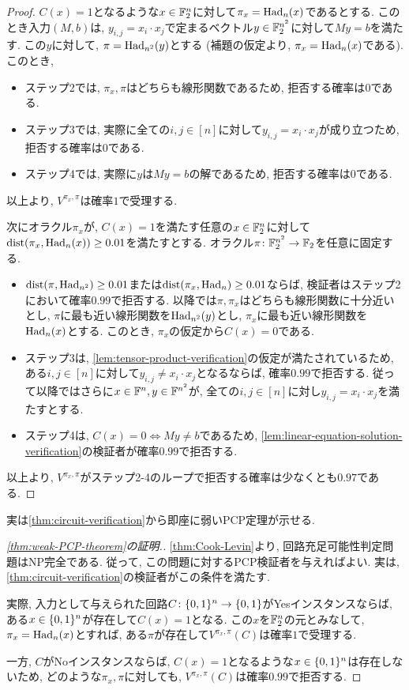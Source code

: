 \begin{proof}
    $C(x)=1$となるような$x\in\mathbb{F}_2^n$に対して$\pi_x=\mathrm{Had}_n(x)$であるとする.
    このとき入力$(M,b)$は, $y_{i,j}=x_i\cdot x_j$で定まるベクトル$y\in\mathbb{F}_2^{n^2}$に対して$My=b$を満たす.
    この$y$に対して, $\pi=\mathrm{Had}_{n^2}(y)$とする (補題の仮定より, $\pi_x=\mathrm{Had}_n(x)$である).
    このとき, 
    \begin{itemize}
      \item ステップ2では, $\pi_x,\pi$はどちらも線形関数であるため, 拒否する確率は$0$である.
      \item ステップ3では, 実際に全ての$i,j\in [n]$に対して$y_{i,j}=x_i\cdot x_j$が成り立つため, 拒否する確率は$0$である.
      \item ステップ4では, 実際に$y$は$My=b$の解であるため, 拒否する確率は$0$である.
    \end{itemize}
    以上より, $V^{\pi_x,\pi}$は確率$1$で受理する.

    次にオラクル$\pi_x$が, $C(x)=1$を満たす任意の$x\in\mathbb{F}_2^n$に対して$\mathrm{dist}(\pi_x,\mathrm{Had}_n(x))\ge 0.01$を満たすとする. オラクル$\pi\colon\mathbb{F}_2^{n^2}\to\mathbb{F}_2$を任意に固定する.

    \begin{itemize}
      \item $\mathrm{dist}(\pi,\mathrm{Had}_{n^2})\ge 0.01$または$\mathrm{dist}(\pi_x,\mathrm{Had}_n)\ge 0.01$ならば, 検証者はステップ2において確率$0.99$で拒否する. 以降では$\pi,\pi_x$はどちらも線形関数に十分近いとし, $\pi$に最も近い線形関数を$\mathrm{Had}_{n^2}(y)$とし, $\pi_x$に最も近い線形関数を$\mathrm{Had}_n(x)$とする. このとき, $\pi_x$の仮定から$C(x)=0$である.
      \item ステップ3は, \cref{lem:tensor-product-verification}の仮定が満たされているため, ある$i,j\in[n]$に対して$y_{i,j}\ne x_i\cdot x_j$となるならば, 確率$0.99$で拒否する.
      従って以降ではさらに$x\in\mathbb{F}^n,y\in\mathbb{F}^{n^2}$が, 全ての$i,j\in [n]$に対し$y_{i,j}=x_i\cdot x_j$を満たすとする.
      \item ステップ4は, $C(x)=0\iff My\ne b$であるため, \cref{lem:linear-equation-solution-verification}の検証者が確率$0.99$で拒否する.
    \end{itemize}
    以上より, $V^{\pi_x,\pi}$がステップ2-4のループで拒否する確率は少なくとも$0.97$である.
  \end{proof}
    
  実は\cref{thm:circuit-verification}から即座に弱いPCP定理が示せる.
  \begin{proof}[\cref{thm:weak-PCP-theorem}の証明.]
    \cref{thm:Cook-Levin}より, 回路充足可能性判定問題はNP完全である.
    従って, この問題に対するPCP検証者を与えればよい.
    実は, \cref{thm:circuit-verification}の検証者がこの条件を満たす.

    実際,
    入力として与えられた回路$C\colon\{0,1\}^n\to\{0,1\}$がYesインスタンスならば,
    ある$x\in\{0,1\}^n$が存在して$C(x)=1$となる.
    この$x$を$\mathbb{F}_2^n$の元とみなして, $\pi_x = \mathrm{Had}_n(x)$とすれば, ある$\pi$が存在して$V^{\pi_x,\pi}(C)$は確率$1$で受理する.

    一方, $C$がNoインスタンスならば, $C(x)=1$となるような$x\in\{0,1\}^n$は存在しないため, どのような$\pi_x,\pi$に対しても, $V^{\pi_x,\pi}(C)$は確率$0.99$で拒否する.    
  \end{proof}

